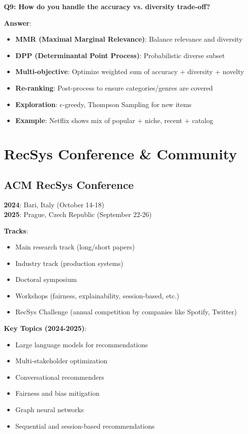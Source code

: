 \documentclass[10pt]{article}
\begin{document}
\textbf{Q9: How do you handle the accuracy vs. diversity trade-off?}

\textbf{Answer}:
\begin{itemize}[leftmargin=*]
    \item \textbf{MMR (Maximal Marginal Relevance)}: Balance relevance and diversity
    \item \textbf{DPP (Determinantal Point Process)}: Probabilistic diverse subset
    \item \textbf{Multi-objective}: Optimize weighted sum of accuracy + diversity + novelty
    \item \textbf{Re-ranking}: Post-process to ensure categories/genres are covered
    \item \textbf{Exploration}: $\epsilon$-greedy, Thompson Sampling for new items
    \item \textbf{Example}: Netflix shows mix of popular + niche, recent + catalog
\end{itemize}

\section{RecSys Conference \& Community}

\subsection{ACM RecSys Conference}

\textbf{2024}: Bari, Italy (October 14-18) \\
\textbf{2025}: Prague, Czech Republic (September 22-26)

\textbf{Tracks}:
\begin{itemize}[leftmargin=*]
    \item Main research track (long/short papers)
    \item Industry track (production systems)
    \item Doctoral symposium
    \item Workshops (fairness, explainability, session-based, etc.)
    \item RecSys Challenge (annual competition by companies like Spotify, Twitter)
\end{itemize}

\textbf{Key Topics (2024-2025)}:
\begin{itemize}[leftmargin=*]
    \item Large language models for recommendations
    \item Multi-stakeholder optimization
    \item Conversational recommenders
    \item Fairness and bias mitigation
    \item Graph neural networks
    \item Sequential and session-based recommendations
\end{itemize}
\end{document}
